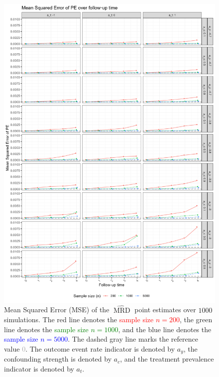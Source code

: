 \documentclass[pdflatex,sn-vancouver-ay]{sn-jnl}%
\theoremstyle{thmstyleone}%
\theoremstyle{thmstyletwo}%
\theoremstyle{thmstylethree}%
\begin{document}
\begin{appendices}
\begin{figure}[H]
\centering
\includegraphics[height=0.95\textheight]{plots/plots_PE_MSE.png}
\caption{Mean Squared Error (MSE) of the $\widehat{\operatorname{MRD}}$ point estimates over $1000$ simulations. The red line denotes the \textcolor{red}{sample size $n = 200$}, the green line denotes the \textcolor{green}{sample size $n = 1000$}, and the blue line denotes the \textcolor{blue}{sample size $n = 5000$}. The dashed gray line marks the reference value \textcolor{darkgray}{$0$}. The outcome event rate indicator is denoted by $a_y$, the confounding strength is denoted by $a_c$, and the treatment prevalence indicator is denoted by $a_t$.}\label{plt:MSE}
\end{figure}

\newpage






\end{appendices}
\end{document}
